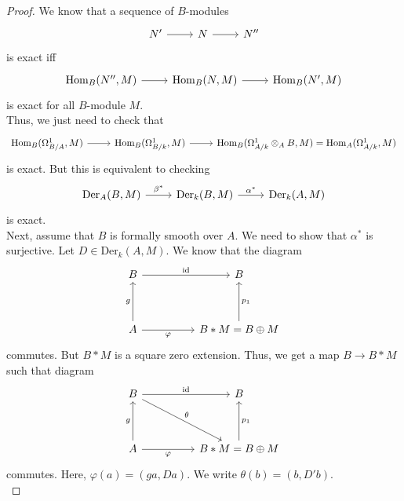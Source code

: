 \documentclass[oneside, 12pt, ]{scrbook}
\theoremstyle{theorem}
\begin{document}
\begin{proof}
We know that a sequence of $B$-modules \[\begin{tikzcd}
	{N'} & N & {N''}
	\arrow[from=1-1, to=1-2]
	\arrow[from=1-2, to=1-3]
\end{tikzcd}\] is exact iff \[\begin{tikzcd}
	{\mathrm{Hom}_{B}(N'',M)} & {\mathrm{Hom}_{B}(N,M)} & {\mathrm{Hom}_{B}(N',M)}
	\arrow[from=1-1, to=1-2]
	\arrow[from=1-2, to=1-3]
\end{tikzcd}\] is exact for all $B$-module $M$. \\

Thus, we just need to check that \[\begin{tikzcd}
	{\mathrm{Hom}_{B}(\Omega_{B/A}^{1},M)} & {\mathrm{Hom}_{B}(\Omega_{B/k}^{1},M)} & {\mathrm{Hom}_{B}(\Omega_{A/k}^{1} \otimes_{A} B,M)} = {\mathrm{Hom}_{A}(\Omega_{A/k}^{1},M)}
	\arrow[from=1-1, to=1-2]
	\arrow[from=1-2, to=1-3]
\end{tikzcd}\] is exact. But this is equivalent to checking \[\begin{tikzcd}
	{\mathrm{Der}_{A}(B,M)} & {\mathrm{Der}_{k}(B,M)} & {\mathrm{Der}_{k}(A,M)}
	\arrow["{\beta^*}", from=1-1, to=1-2]
	\arrow["{\alpha^*}", from=1-2, to=1-3]
\end{tikzcd}\] is exact. \\

Next, assume that $B$ is formally smooth over $A$. We need to show that $\alpha^*$ is surjective. Let $D\in \mathrm{Der}_{k}(A,M)$. We know that the diagram \[\begin{tikzcd}
	B && B \\
	\\
	A && {B*M = B \oplus M}
	\arrow["{\mathrm{id}}", from=1-1, to=1-3]
	\arrow["{p_{1}}"', from=3-3, to=1-3]
	\arrow["g", from=3-1, to=1-1]
	\arrow["\varphi"', from=3-1, to=3-3]
\end{tikzcd}\] commutes. But $B * M$ is a square zero extension. Thus, we get a map $B \rightarrow B *M$ such that diagram \[\begin{tikzcd}
	B && B \\
	\\
	A && {B*M = B \oplus M}
	\arrow["{\mathrm{id}}", from=1-1, to=1-3]
	\arrow["{p_{1}}"', from=3-3, to=1-3]
	\arrow["g", from=3-1, to=1-1]
	\arrow["\varphi"', from=3-1, to=3-3]
	\arrow["\theta", from=1-1, to=3-3]
\end{tikzcd}\]
commutes. Here, $\varphi(a) = (ga, Da)$. We write $\theta (b) = (b, D'b)$. \\


\end{proof}
\end{document}
